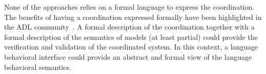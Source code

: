 None of the approaches relies on a formal language to express the coordination. The benefits of having a coordination expressed formally have been highlighted in the ADL community~\cite{wrightbib,rapidebib}. A formal description of the coordination together with a formal description of the semantics of models (at least partial) could provide the verification and validation of the coordinated system. In this context, a language behavioral interface could provide an abstract and formal view of the language behavioral semantics.


%	
%		
%		
%     
	
	
	
	
	
	
	
	
		
	 	
